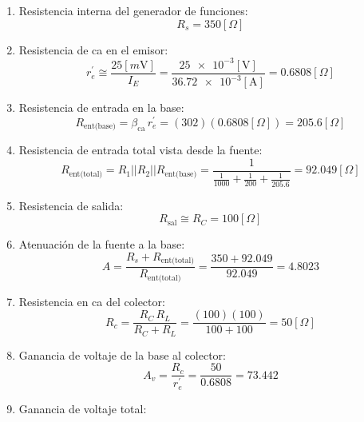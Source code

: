 \begin{enumerate}
\item Resistencia interna del generador de funciones:
\begin{equation*}
    R_s = 350[\Omega]
\end{equation*}
\item Resistencia de ca en el emisor:
\begin{equation*}
    r_e^{'} \cong \frac{25[m{\text{V}}]}{I_E}
            = \frac{\num{25e-3}[\text{V}]}{\num{36.72e-3}[\text{A}]}
            = 0.6808[\Omega]
\end{equation*}
\item Resistencia de entrada en la base:
\begin{equation*}
    R_{\text{ent(base)}} = \beta_{\text{ca}}\,r_e^{'}
                         = (302)(0.6808[\Omega])
                         = 205.6[\Omega]
\end{equation*}
\item Resistencia de entrada total vista desde la fuente:
\begin{equation*}
    R_{\text{ent(total)}} = R_1 || R_2 || R_{\text{ent(base)}}
                          = \dfrac{1}{\frac{1}{1000}+\frac{1}{200}+\frac{1}{205.6}}
                          = 92.049[\Omega]
\end{equation*}
\item Resistencia de salida:
\begin{equation*}
    R_{\text{sal}} \cong R_C
                   = 100[\Omega]
\end{equation*}
\item Atenuación de la fuente a la base:
\begin{equation*}
    A = \frac{R_s+R_{\text{ent(total)}}}{R_{\text{ent(total)}}}
      = \frac{350+92.049}{92.049}
      = 4.8023
\end{equation*}
\item Resistencia en ca del colector:
\begin{equation*}
    R_c = \frac{R_C\,R_L}{R_C+R_L}
        = \frac{(100)(100)}{100+100}
        = 50[\Omega]
\end{equation*}
\item Ganancia de voltaje de la base al colector:
\begin{equation*}
    A_v = \frac{R_c}{r_e^{'}}
        = \frac{50}{0.6808}
        = 73.442
\end{equation*}
\item Ganancia de voltaje total:
\begin{equation*}

\end{equation*}
\end{enumerate}
